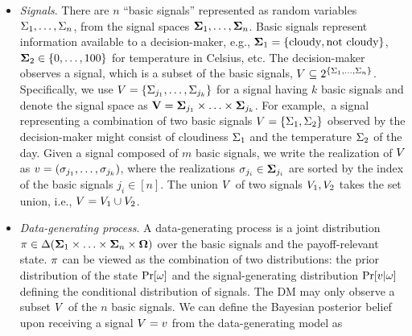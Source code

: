 \begin{itemize}[wide]
    \mvspace{-3mm}
    \item \textit{Signals}. There are $n$ ``basic signals'' represented as random variables $\Sigma_1, \ldots, \Sigma_n$, from the signal spaces $\mathbf{\Sigma}_1, \ldots, \mathbf{\Sigma}_n$. Basic signals represent information available to a decision-maker, e.g., $\mathbf{\Sigma}_1 = \{\text{cloudy}, \text{not cloudy}\}$, $\mathbf{\Sigma}_2\in \{0, \ldots, 100\}$ for temperature in Celsius, etc. 
    The decision-maker observes a signal, which is a subset of the basic signals, $V \subseteq 2^{\{\Sigma_1, \dots, \Sigma_n\}}$. 
    Specifically, we use $V = \{\Sigma_{j_1}, \ldots, \Sigma_{j_k}\}$ for a signal having $k$ basic signals and denote the signal space as $\mathbf{V} = \mathbf{\Sigma}_{j_1} \times \ldots \times \mathbf{\Sigma}_{j_k}$.
    For example,\ a signal representing a combination of two basic signals $V = \{\Sigma_1, \Sigma_2\}$ observed by the decision-maker might consist of cloudiness $\Sigma_1$ and the temperature $\Sigma_2$ of the day. Given a signal composed of $m$ basic signals, we write the realization of $V$ as $v = (\sigma_{j_1}, \dots, \sigma_{j_{k}})$, where the realizations $\sigma_{j_i} \in \mathbf{\Sigma}_{j_i}$ are sorted by the index of the basic signals $j_i \in [n]$.
    The union $V$ of two signals $V_1, V_2$ takes the set union, i.e., $V = V_1\cup V_2$.
     \mvspace{-1mm}
    \item \textit{Data-generating process}. A data-generating process is a joint distribution $\pi\in \Delta(\mathbf{\Sigma}_1 \times \ldots \times \mathbf{\Sigma}_n \times\mathbf{\Omega})$ over the basic signals and the payoff-relevant state. $\pi$ can be viewed as the combination of two distributions: the prior distribution of the state $\Pr[\omega]$ and the signal-generating distribution $\Pr[v | \omega]$ defining the conditional distribution of signals. The DM may only observe a subset $V$ of the $n$ basic signals. We can define the Bayesian posterior belief upon receiving a signal $V = v$ from the data-generating model as

\end{itemize}
